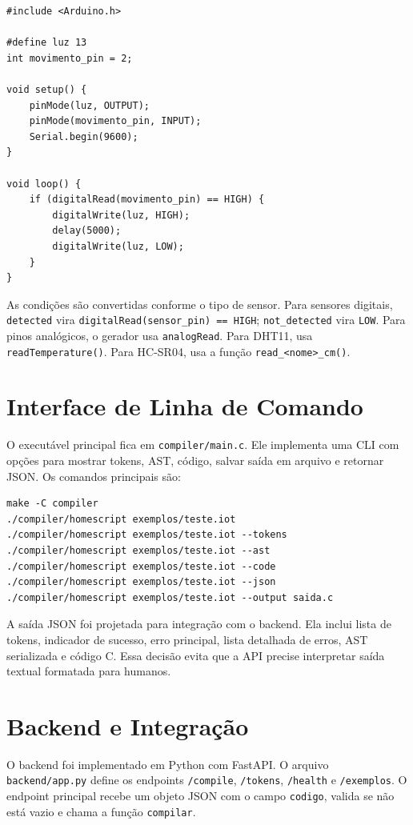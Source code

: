 \documentclass[conference]{IEEEtran}
\begin{document}
\begin{lstlisting}[style=csmall,caption={Exemplo de código C/Arduino gerado.},label={lst:generated}]
#include <Arduino.h>

#define luz 13
int movimento_pin = 2;

void setup() {
    pinMode(luz, OUTPUT);
    pinMode(movimento_pin, INPUT);
    Serial.begin(9600);
}

void loop() {
    if (digitalRead(movimento_pin) == HIGH) {
        digitalWrite(luz, HIGH);
        delay(5000);
        digitalWrite(luz, LOW);
    }
}
\end{lstlisting}

As condições são convertidas conforme o tipo de sensor. Para sensores digitais, \texttt{detected} vira \texttt{digitalRead(sensor\_pin) == HIGH}; \texttt{not\_detected} vira \texttt{LOW}. Para pinos analógicos, o gerador usa \texttt{analogRead}. Para DHT11, usa \texttt{readTemperature()}. Para HC-SR04, usa a função \texttt{read\_<nome>\_cm()}.

\section{Interface de Linha de Comando}
O executável principal fica em \texttt{compiler/main.c}. Ele implementa uma CLI com opções para mostrar tokens, AST, código, salvar saída em arquivo e retornar JSON. Os comandos principais são:

\begin{lstlisting}[basicstyle=\ttfamily\scriptsize,frame=single,breaklines=true]
make -C compiler
./compiler/homescript exemplos/teste.iot
./compiler/homescript exemplos/teste.iot --tokens
./compiler/homescript exemplos/teste.iot --ast
./compiler/homescript exemplos/teste.iot --code
./compiler/homescript exemplos/teste.iot --json
./compiler/homescript exemplos/teste.iot --output saida.c
\end{lstlisting}

A saída JSON foi projetada para integração com o backend. Ela inclui lista de tokens, indicador de sucesso, erro principal, lista detalhada de erros, AST serializada e código C. Essa decisão evita que a API precise interpretar saída textual formatada para humanos.

\section{Backend e Integração}
O backend foi implementado em Python com FastAPI. O arquivo \texttt{backend/app.py} define os endpoints \texttt{/compile}, \texttt{/tokens}, \texttt{/health} e \texttt{/exemplos}. O endpoint principal recebe um objeto JSON com o campo \texttt{codigo}, valida se não está vazio e chama a função \texttt{compilar}.
\end{document}
